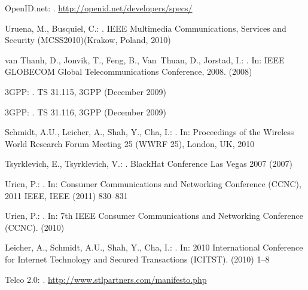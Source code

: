 \documentclass[runningheads,a4paper]{llncs}
\begin{document}
\begin{thebibliography}{10}
{OpenID.net}:
.
\newblock \url{http://openid.net/developers/specs/}

Uruena, M., Busquiel, C.:
.
\newblock IEEE Multimedia Communications, Services and Security
  (MCSS2010)(Krakow, Poland, 2010)

van Thanh, D., Jonvik, T., Feng, B., Van~Thuan, D., Jorstad, I.:
.
\newblock In: IEEE GLOBECOM Global Telecommunications Conference, 2008. (2008)

3GPP:
.
\newblock TS {31.115}, {3GPP} (December 2009)

3GPP:
.
\newblock TS {31.116}, {3GPP} (December 2009)

Schmidt, A.U., Leicher, A., Shah, Y., Cha, I.:
.
\newblock In: Proceedings of the Wireless World Research Forum Meeting 25 (WWRF
  25), London, UK, 2010


Tsyrklevich, E., Tsyrklevich, V.:
.
\newblock BlackHat Conference Las Vegas 2007 (2007)


Urien, P.:
.
\newblock In: Consumer Communications and Networking Conference (CCNC), 2011
  IEEE, IEEE (2011)  830--831

Urien, P.:
.
\newblock In: 7th IEEE Consumer Communications and Networking Conference
  (CCNC). (2010)
  
Leicher, A., Schmidt, A.U., Shah, Y., Cha, I.:
.
\newblock In: 2010 International Conference for Internet Technology and Secured
  Transactions (ICITST). (2010)  1--8  

{Telco 2.0}:
.
\newblock \url{http://www.stlpartners.com/manifesto.php}


\end{thebibliography}
\end{document}
